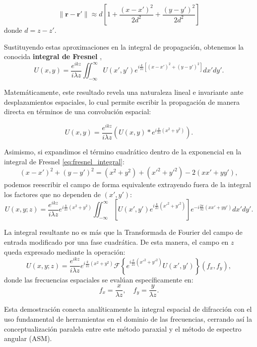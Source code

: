 \documentclass[12pt,a4paper]{article}
\numberwithin{equation}{section}
\begin{document}
$$\|\mathbf{r}-\mathbf{r}'\| \approx d \left[ 1 + \frac{(x-x')^2}{2d^2} + \frac{(y-y')^2}{2d^2} \right]$$
donde $d=z-z'$.

Sustituyendo estas aproximaciones en la integral de propagación, obtenemos la conocida \textbf{integral de Fresnel} \cite{goodman2005},
\begin{equation}
U(x,y) = \frac{e^{ikz}}{i\lambda z} \iint_{-\infty}^{\infty} U(x',y') e^{i\frac{k}{2z} \left[ (x-x')^2 + (y-y')^2 \right]} dx'dy'.
\label{eq:fresnel_integral}
\end{equation}

Matemáticamente, este resultado revela una naturaleza lineal e invariante ante desplazamientos espaciales, lo cual permite escribir la propagación de manera directa en términos de una convolución espacial:

\begin{equation}
U(x,y) = \frac{e^{ikz}}{i\lambda z} \left( U(x,y) * e^{i\frac{k}{2z}(x^2+y^2)} \right).
\end{equation}

Asimismo, si expandimos el término cuadrático dentro de la exponencial en la integral de Fresnel \eqref{eq:fresnel_integral}:
\begin{equation*}
(x-x')^2 + (y-y')^2 = (x^2 + y^2) + (x'^2 + y'^2) - 2(xx' + yy'),
\end{equation*}
podemos reescribir el campo de forma equivalente extrayendo fuera de la integral los factores que no dependen de $(x', y')$:
\begin{equation}
U(x,y;z) = \frac{e^{ikz}}{i\lambda z} e^{i\frac{k}{2z}(x^2+y^2)} \iint_{-\infty}^{\infty} \left[ U(x',y') e^{i\frac{k}{2z}(x'^2+y'^2)} \right] e^{-i\frac{2\pi}{\lambda z}(xx'+yy')} dx'dy'.
\end{equation}

La integral resultante no es más que la Transformada de Fourier del campo de entrada modificado por una fase cuadrática. De esta manera, el campo en $z$ queda expresado mediante la operación:
\begin{equation}
U(x,y;z) = \frac{e^{ikz}}{i\lambda z} e^{i\frac{k}{2z}(x^2+y^2)} \mathscr{F} \left\{ e^{i\frac{k}{2z}(x'^2+y'^2)} U(x',y') \right\}(f_x, f_y),
\end{equation}
donde las frecuencias espaciales se evalúan específicamente en:
\begin{equation}
f_x = \frac{x}{\lambda z}, \quad f_y = \frac{y}{\lambda z}.
\end{equation}

Esta demostración conecta analíticamente la integral espacial de difracción con el uso fundamental de herramientas en el dominio de las frecuencias, cerrando así la conceptualización paralela entre este método paraxial y el método de espectro angular (ASM).

\printbibliography
\end{document}

